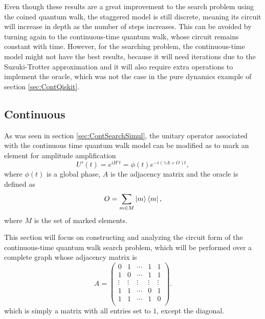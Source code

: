 \documentclass[../../dissertation.tex]{subfiles}
\begin{document}
Even though these results are a great improvement to the search problem using
the coined quantum walk, the staggered model is still discrete, meaning its
circuit will increase in depth as the number of steps increases. This can be
avoided by turning again to the continuous-time quantum walk, whose circuit
remains constant with time.  However, for the searching problem, the
continuous-time model might not have the best results, because it will need
iterations due to the Suzuki-Trotter approximation and it will also require
extra operations to implement the oracle, which was not the case in the pure
dynamics example of section \ref{sec:ContQiskit}.

\subsection{Continuous}
As was seen in section \ref{sec:ContSearchSimul}, the unitary operator
associated with the continuous time quantum walk model can be modified as to
mark an element for amplitude amplification
\begin{equation}
	U'(t) = e^{iH't} = \phi(t)e^{-i(\gamma A+O)t},
	\label{eq:qiskitU'}
\end{equation}
where $\phi(t)$ is a global phase, $A$ is the adjacency matrix and the oracle
is defined as 
\begin{equation}
	O = \sum_{m \in M} \ket{m}\bra{m},
\end{equation}
where $M$ is the set of marked elements.\par

This section will focus on constructing and analyzing the circuit form of the
continuous-time quantum walk search problem, which will be performed over a
complete graph whose adjacency matrix is
\begin{equation}
  A = 	\begin{pmatrix}
	  0 & 1 &  \cdots & 1 & 1\\
	  1 & 0 & \cdots & 1 & 1\\
	   \vdots & \vdots  & \vdots & \vdots& \vdots\\
	  1 & 1 & \cdots & 0 & 1\\ 
	  1 & 1 & \cdots & 1 & 0\\ 
	\end{pmatrix}.
\end{equation}
which is simply a matrix with all entries set to $1$, except the diagonal.\par
\end{document}
